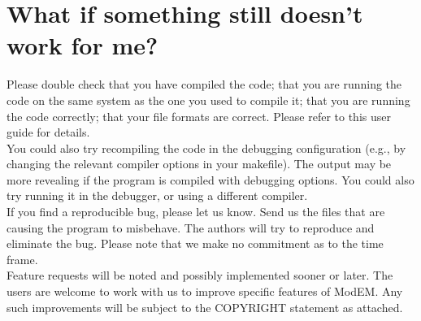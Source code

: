 \documentclass[12pt]{article}
\begin{document}
\section{What if something still doesn't work for me?}

Please double check that you have compiled the code; that you are running the code on the same system as the one you used to compile it; that you are running the code correctly; that your file formats are correct. Please refer to this user guide for details.\\

You could also try recompiling the code in the debugging configuration (e.g., by changing the relevant compiler options in your makefile). The output may be more revealing if the program is compiled with debugging options. You could also try running it in the debugger, or using a different compiler.\\

If you find a reproducible bug, please let us know. Send us the files that are causing the program to misbehave. The authors will try to reproduce and eliminate the bug. Please note that we make no commitment as to the time frame.\\

Feature requests will be noted and possibly implemented sooner or later.
The users are welcome to work with us to improve specific features of ModEM.
Any such improvements will be subject to the COPYRIGHT statement as attached.
\end{document}
